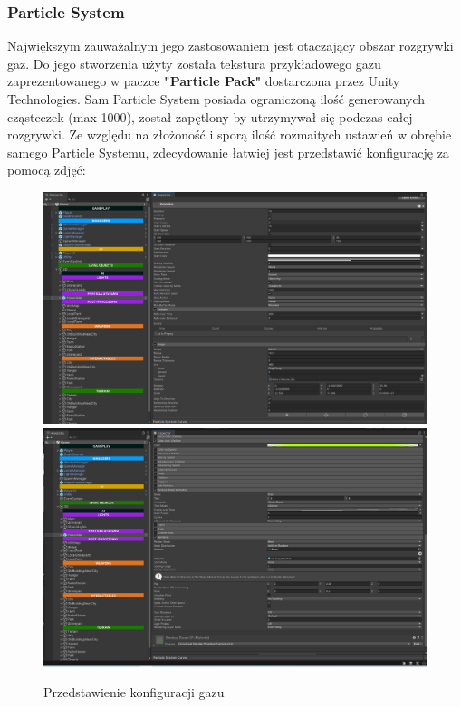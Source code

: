 \subsubsection{Particle System}
Największym zauważalnym jego zastosowaniem jest otaczający obszar rozgrywki gaz.
Do jego stworzenia użyty została tekstura przykładowego gazu zaprezentowanego w paczce \textbf{"Particle Pack"} dostarczona przez Unity Technologies.
Sam Particle System posiada ograniczoną ilość generowanych cząsteczek (max 1000), został zapętlony by utrzymywał się podczas całej rozgrywki.
Ze względu na złożoność i sporą ilość rozmaitych ustawień w obrębie samego Particle Systemu, zdecydowanie łatwiej jest przedstawić konfigurację za pomocą zdjęć:
\begin{figure}[h]
    \centering
    \includegraphics[width=1\linewidth]{Images/gaz1.PNG}
    \centering
    \includegraphics[width=1\linewidth]{Images/gaz2.PNG}
    \caption{Przedstawienie konfiguracji gazu}
\end{figure}
\FloatBarrier
